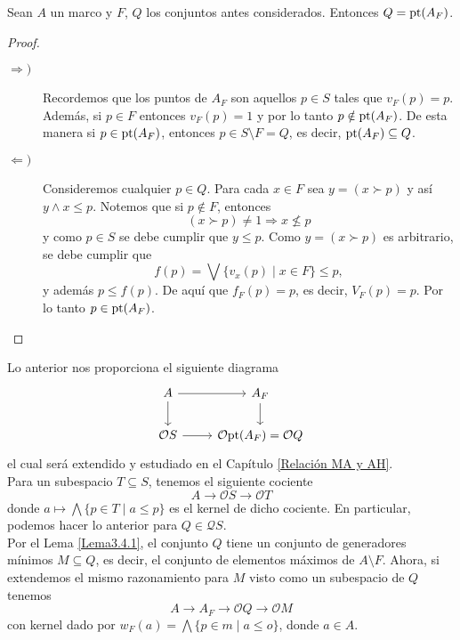 \begin{lem}\label{Lema5.7.1}
    Sean $A$ un marco y $F$, $Q$ los conjuntos antes considerados. Entonces $Q=\mathrm{pt}(A_F)$.
\end{lem}

\begin{proof}
\begin{description}
    \item[$\Rightarrow) $] Recordemos que los puntos de $A_F$ son aquellos $p\in S$ tales que $v_F(p)=p$. Además, si $p\in F$ entonces $v_F(p)=1$ y por lo tanto $p\notin \mathrm{pt}(A_F)$. De esta manera si $p\in \mathrm{pt}(A_F)$, entonces $p\in S\setminus F=Q$, es decir, $\mathrm{pt}(A_F)\subseteq Q$.
    
    \item[$\Leftarrow) $] Consideremos cualquier $p\in Q$. Para cada $x\in F$ sea $y=(x\succ p)$ y así $y\wedge x\leq p$. Notemos que si $p\notin F$, entonces
    \[
    (x\succ p)\neq 1\Rightarrow x\nleq p
    \]
    y como $p\in S$ se debe cumplir que $y\leq p$. Como $y=(x\succ p)$ es arbitrario, se debe cumplir que
    \[
    f(p)=\bigvee\{v_x(p)\mid x\in F\}\leq p,
    \]
    y además $p\leq f(p)$. De aquí que $f_F(p)=p$, es decir, $V_F(p)=p$. Por lo tanto $p \in \mathrm{pt}(A_F)$. 
    
\end{description}
\end{proof}

Lo anterior nos proporciona el siguiente diagrama
\begin{equation}
    \begin{tikzcd}
	A & {A_F} \\
	{\mathcal{O}S} & {\mathcal{O}\pt(A_F)=\mathcal{O}Q}
	\arrow[from=1-1, to=1-2]
	\arrow[from=1-1, to=2-1]
	\arrow[from=1-2, to=2-2]
	\arrow[from=2-1, to=2-2]
\end{tikzcd}
\end{equation}
el cual será extendido y estudiado en el Capítulo \ref{Relación MA y AH}.\\

Para un subespacio $T\subseteq S$, tenemos el siguiente cociente
\[
A\to \mathcal{O}S\to \mathcal{O}T
\]
donde $a\mapsto \bigwedge \{p\in T\mid a\leq p\}$ es el kernel de dicho cociente. En particular, podemos hacer lo anterior para $Q\in \mathcal{Q}S$.\\

Por el Lema \ref{Lema3.4.1}, el conjunto $Q$ tiene un conjunto de generadores mínimos $M\subseteq Q$, es decir, el conjunto de elementos máximos de $A\setminus F$. Ahora, si extendemos el mismo razonamiento para $M$ visto como un subespacio de $Q$ tenemos
\begin{equation}\label{Cociente a M}
A\to A_F \to \mathcal{O}Q \to \mathcal{O}M
\end{equation}
con kernel dado por $w_F(a)=\bigwedge \{p\in m\mid a\leq o\}$, donde $a\in A$. 

